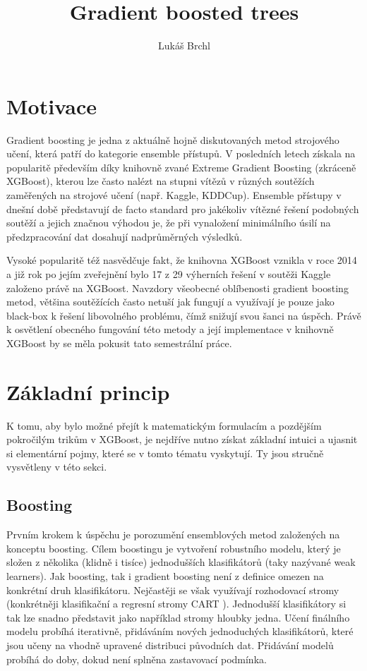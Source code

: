 \documentclass[a4paper]{article}
\title{Gradient boosted trees}
\author{Lukáš Brchl}
\begin{document}
\maketitle

\section{Motivace}
Gradient boosting je jedna z aktuálně hojně diskutovaných metod strojového učení, která patří do kategorie ensemble přístupů. V posledních letech získala na popularitě především díky knihovně zvané Extreme Gradient Boosting \cite{DBLP:journals/corr/ChenG16} (zkráceně XGBoost), kterou lze často nalézt na stupni vítězů v různých soutěžích zaměřených na strojové učení (např. Kaggle, KDDCup). Ensemble přístupy v dnešní době představují de facto standard pro jakékoliv vítězné řešení podobných soutěží a jejich značnou výhodou je, že při vynaložení minimálního úsilí na předzpracování dat dosahují nadprůměrných výsledků.

Vysoké popularitě též nasvědčuje fakt, že knihovna XGBoost vznikla v roce 2014 a již rok po jejím zveřejnění bylo 17 z 29 výherních řešení v soutěži Kaggle založeno právě na XGBoost. Navzdory všeobecné oblíbenosti gradient boosting metod, většina soutěžících často netuší jak fungují a využívají je pouze jako black-box k řešení libovolného problému, čímž snižují svou šanci na úspěch. Právě k osvětlení obecného fungování této metody a její implementace v knihovně XGBoost by se měla pokusit tato semestrální práce. 


\section{Základní princip}
K tomu, aby bylo možné přejít k matematickým formulacím a pozdějším pokročilým trikům v XGBoost, je nejdříve nutno získat základní intuici a ujasnit si elementární pojmy, které se v tomto tématu vyskytují. Ty jsou stručně vysvětleny v této sekci.

\subsection{Boosting}
Prvním krokem k úspěchu je porozumění ensemblových metod založených na konceptu boosting. Cílem boostingu je vytvoření robustního modelu, který je složen z několika (klidně i tisíce) jednodušších klasifikátorů (taky nazývané weak learners). Jak boosting, tak i gradient boosting není z definice omezen na konkrétní druh klasifikátoru. Nejčastěji se však využívají rozhodovací stromy (konkrétněji klasifikační a regresní stromy CART \cite{breiman2017classification}). Jednodušší klasifikátory si tak lze snadno představit jako například stromy hloubky jedna. Učení finálního modelu probíhá iterativně, přidáváním nových jednoduchých klasifikátorů, které jsou učeny na vhodně upravené distribuci původních dat. Přidávání modelů probíhá do doby, dokud není splněna zastavovací podmínka. 
\end{document}
